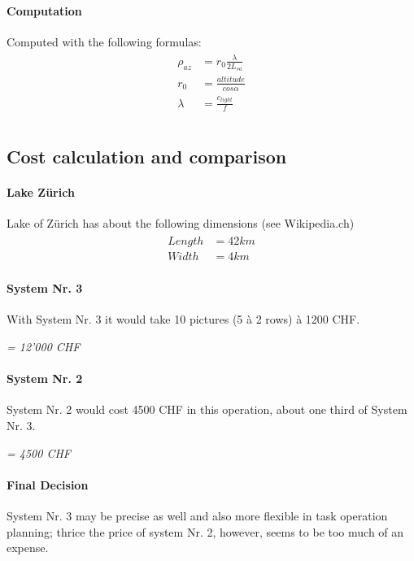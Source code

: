 \documentclass[11pt,a4paper,BCOR12mm, headexclude, footexclude, twoside, openright]{scrartcl}
\numberwithin{equation}{section} %
\numberwithin{figure}{section} %
\numberwithin{table}{section} %
\begin{document}
\paragraph{Computation}Computed with the following formulas:
\begin{align} 
\begin{split}
{\rho}_{az}&={r}_{0} \frac{\lambda}{2{L}_{sa}} \\[0.15cm]
{r}_{0}&=\frac{altitude}{cos{\alpha}}\\[0.15cm]
\lambda&=\frac{{c}_{light}}{f}\\
\end{split}			
\end{align}

\subsection{Cost calculation and comparison}
\paragraph{Lake Zürich}
Lake of Zürich has about the following dimensions (see Wikipedia.ch)
\begin{align}
\begin{split}
Length &= 42 km\\
Width &= 4 km
\end{split}
\end{align}
\paragraph{System Nr. 3}With System Nr. 3 it would take 10 pictures (5 à 2 rows) à 1200 CHF.
\begin{center}
\emph{= 12'000 CHF}
\end{center}

\paragraph{System Nr. 2}System Nr. 2 would cost 4500 CHF in this operation, about one third of System Nr. 3.
\begin{center}
\emph{= 4500 CHF}
\end{center}

\paragraph{Final Decision}System Nr. 3 may be precise as well and also more flexible in task operation planning; thrice the price of system Nr. 2, however, seems to be too much of an expense.
\end{document}
